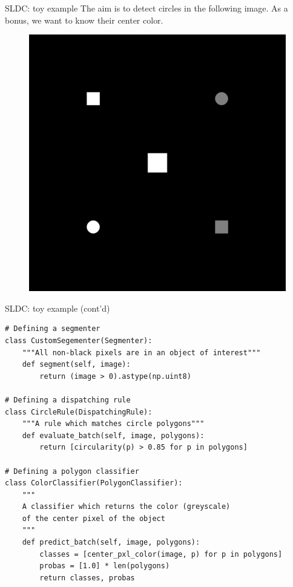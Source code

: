 \documentclass{beamer}
\begin{document}

\begin{frame}{SLDC: toy example}
	The aim is to detect circles in the following image. As a bonus, we want to know their center color.
	\vfill
	\begin{figure}
		\includegraphics[scale=0.04]{images/toy_example.png}
	\end{figure}
	\vfill
\end{frame}

\begin{frame}[fragile]{SLDC: toy example (cont'd)}
\begin{verbatim}
# Defining a segmenter
class CustomSegementer(Segmenter):
    """All non-black pixels are in an object of interest"""
    def segment(self, image):
        return (image > 0).astype(np.uint8)
        
# Defining a dispatching rule 
class CircleRule(DispatchingRule):
    """A rule which matches circle polygons"""
    def evaluate_batch(self, image, polygons):
        return [circularity(p) > 0.85 for p in polygons]

# Defining a polygon classifier
class ColorClassifier(PolygonClassifier):
    """
    A classifier which returns the color (greyscale) 
    of the center pixel of the object
    """
    def predict_batch(self, image, polygons):
        classes = [center_pxl_color(image, p) for p in polygons]
        probas = [1.0] * len(polygons)
        return classes, probas
\end{verbatim}
\end{frame}
\end{document}
